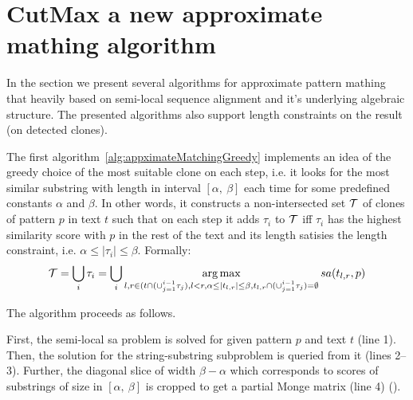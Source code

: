 \section{CutMax a new approximate mathing algorithm}
\label{section:our}

In the section we present several algorithms for approximate pattern mathing that heavily based on semi-local sequence alignment and it's underlying algebraic structure.
The presented algorithms also support length constraints on the result (on detected clones).

The first algorithm~\ref{alg:appximateMatchingGreedy} implements an idea of the greedy choice of the most suitable clone on each step, i.e. it looks for the most similar substring with length in interval $[\alpha,\ \beta]$ each time for some predefined constants $\alpha$ and $\beta$.
In other words, it constructs a non-intersected set ${\mathcal{T}}$ of clones of pattern $p$ in text $t$ such that on each step it adds $\tau_i$ to ${\mathcal{T}}$ iff $\tau_i$ has the highest similarity score with $p$ in the rest of the text and its length satisies the length constraint, i.e. $\alpha \leq |\tau_i| \leq \beta$.
Formally:
\begin{equation}
   {\mathcal{T}} = \bigcup_{i} \tau_i = \bigcup_i \operatorname*{arg\,max}_{l,r \in (t \cap (\cup_{j=1}^{i-1} \tau_{j}),l<r, \alpha \leq |t_{l,r}| \leq \beta ,t_{l,r} \cap (\cup_{j=1}^{i-1} \tau_{j}) = \emptyset } sa(t_{l,r}, p)
\end{equation}

The algorithm proceeds as follows.

First, the semi-local sa problem is solved for given pattern $p$ and text $t$ (line 1).
Then, the solution for the string-substring subproblem is queried from it (lines 2--3).
Further, the diagonal slice of width $\beta-\alpha$ which corresponds to scores of substrings of size in $[\alpha,\ \beta]$ is cropped to get a partial Monge matrix (line 4) ().


